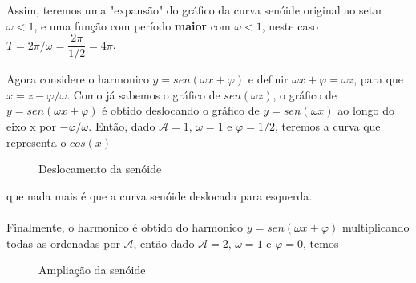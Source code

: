 Assim, teremos uma "expansão" do gráfico da curva senóide original ao setar $\omega < 1$,
e uma função com período \textbf{maior} com $\omega < 1$, neste caso 
\mbox{$T = 2\pi/\omega = \dfrac{2\pi}{1/2} = 4\pi$}.

Agora considere o harmonico $y = sen(\omega x + \varphi)$ e definir $\omega x + \varphi = \omega z$,
para que $x = z - \varphi/\omega$. Como já sabemos o gráfico de $sen(\omega z)$, o gráfico 
de $y = sen(\omega x + \varphi)$ é obtido deslocando o gráfico de $y = sen(\omega x)$ ao
longo do eixo x por $-\varphi/\omega$. Então, dado $\mathcal{A} = 1$, $\omega = 1$ e $\varphi = 1/2$,
teremos a curva que representa o $cos(x)$

\begin{figure}[H]
    \caption{Deslocamento da senóide}
    \label{fig:deslocSen}
\end{figure}

que nada mais é que a curva senóide deslocada para esquerda.\\
\\
Finalmente, o harmonico \senoide é obtido do harmonico $y = sen(\omega x + \varphi)$
multiplicando todas as ordenadas por $\mathcal{A}$, então dado $\mathcal{A} = 2$, $\omega = 1$ e $\varphi = 0$,
temos

\begin{figure}[H]
    \caption{Ampliação da senóide}
    \label{fig:ampSen}
\end{figure}

